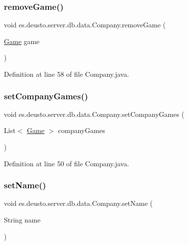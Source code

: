 \subsubsection{\texorpdfstring{remove\+Game()}{removeGame()}}
{\footnotesize\ttfamily void es.\+deusto.\+server.\+db.\+data.\+Company.\+remove\+Game (\begin{DoxyParamCaption}\item[{\hyperlink{classes_1_1deusto_1_1server_1_1db_1_1data_1_1_game}{Game}}]{game }\end{DoxyParamCaption})}



Definition at line 58 of file Company.\+java.

\mbox{\label{classes_1_1deusto_1_1server_1_1db_1_1data_1_1_company_a65c32a8345ba3f82ca96809d5903f544}} 
\subsubsection{\texorpdfstring{set\+Company\+Games()}{setCompanyGames()}}
{\footnotesize\ttfamily void es.\+deusto.\+server.\+db.\+data.\+Company.\+set\+Company\+Games (\begin{DoxyParamCaption}\item[{List$<$ \hyperlink{classes_1_1deusto_1_1server_1_1db_1_1data_1_1_game}{Game} $>$}]{company\+Games }\end{DoxyParamCaption})}



Definition at line 50 of file Company.\+java.

\mbox{\label{classes_1_1deusto_1_1server_1_1db_1_1data_1_1_company_ab33e41d6c5ac9f87ffc7a7b3d73e1f4a}} 
\subsubsection{\texorpdfstring{set\+Name()}{setName()}}
{\footnotesize\ttfamily void es.\+deusto.\+server.\+db.\+data.\+Company.\+set\+Name (\begin{DoxyParamCaption}\item[{String}]{name }\end{DoxyParamCaption})}



